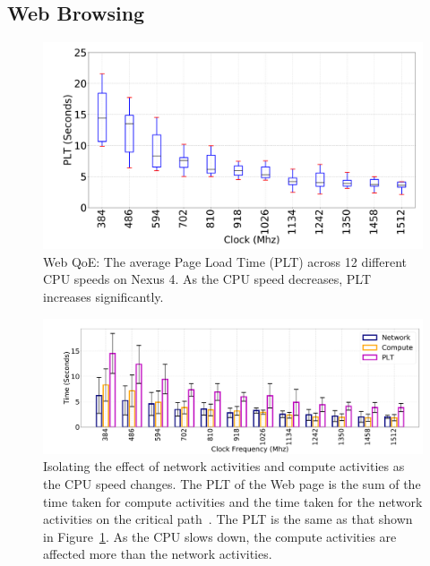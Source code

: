 
\subsection{Web Browsing} \label{label:web}
\begin{figure}[t]
  \centering
  \includegraphics[width=0.9\linewidth]{sections/device-work/plt-clock}
    \caption{Web QoE: The average Page Load Time (PLT) across 12 different CPU speeds on Nexus 4. As the CPU speed decreases, PLT increases significantly. }
  \label{fig:plt_clock}
\end{figure}

\begin{figure}[t]
  \centering
  \includegraphics[width=0.8\linewidth]{sections/device-work/plt-isolate.pdf}
    \caption{Isolating the effect of network activities and compute activities as the CPU speed changes. The PLT of the Web page is the sum of the time taken for compute activities and the time taken for the network activities on the critical path~\cite{wang2013demystifying,nejati2016depth}. The PLT is the same as that shown in Figure~\ref{fig:plt_clock}. As the CPU slows down, the compute activities are affected more than the network activities. }\vspace{-0.2in}
  \label{fig:plt_isolate}
\end{figure}

